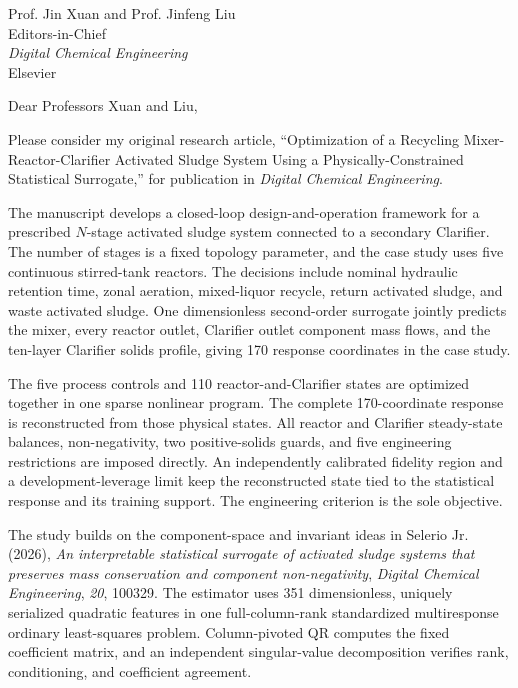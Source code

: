 \documentclass[11pt]{letter}
\date{\today}
\begin{document}
\begin{letter}{Prof. Jin Xuan and Prof. Jinfeng Liu\\
Editors-in-Chief\\
\textit{Digital Chemical Engineering}\\
Elsevier}

\opening{Dear Professors Xuan and Liu,}

Please consider my original research article, ``Optimization of a Recycling Mixer-Reactor-Clarifier Activated Sludge System Using a Physically-Constrained Statistical Surrogate,'' for publication in \textit{Digital Chemical Engineering}.

The manuscript develops a closed-loop design-and-operation framework for a prescribed $N$-stage activated sludge system connected to a secondary Clarifier. The number of stages is a fixed topology parameter, and the case study uses five continuous stirred-tank reactors. The decisions include nominal hydraulic retention time, zonal aeration, mixed-liquor recycle, return activated sludge, and waste activated sludge. One dimensionless second-order surrogate jointly predicts the mixer, every reactor outlet, Clarifier outlet component mass flows, and the ten-layer Clarifier solids profile, giving 170 response coordinates in the case study.

The five process controls and 110 reactor-and-Clarifier states are optimized together in one sparse nonlinear program. The complete 170-coordinate response is reconstructed from those physical states. All reactor and Clarifier steady-state balances, non-negativity, two positive-solids guards, and five engineering restrictions are imposed directly. An independently calibrated fidelity region and a development-leverage limit keep the reconstructed state tied to the statistical response and its training support. The engineering criterion is the sole objective.

The study builds on the component-space and invariant ideas in Selerio Jr. (2026), \emph{An interpretable statistical surrogate of activated sludge systems that preserves mass conservation and component non-negativity}, \textit{Digital Chemical Engineering}, \textit{20}, 100329. The estimator uses 351 dimensionless, uniquely serialized quadratic features in one full-column-rank standardized multiresponse ordinary least-squares problem. Column-pivoted QR computes the fixed coefficient matrix, and an independent singular-value decomposition verifies rank, conditioning, and coefficient agreement.


\end{letter}
\end{document}
